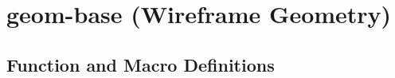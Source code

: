 \documentclass [11pt]{book}
\begin{document}
\label{sec:genworks-gdl(genworks®gdl)}







\section{geom-base (Wireframe Geometry)}

\label{sec:geom-base(wireframegeometry)}





\subsection{Function and Macro Definitions}

\label{subsec:functionandmacrodefinitions}
\end{document}

